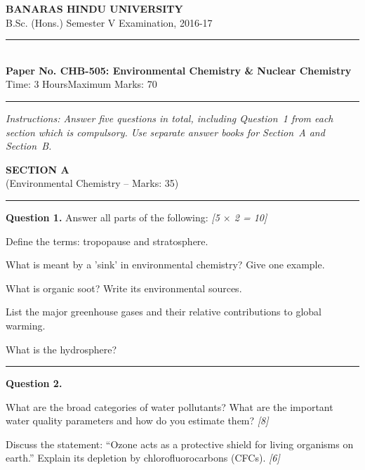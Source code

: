 \documentclass[11pt,a4paper]{article}
\newcommand{\pts}[1]{\hfill   \textit{[#1]}}
\begin{document}
\begin{center}
  {\large\bfseries BANARAS HINDU UNIVERSITY}\\[2pt]
  {\normalsize B.Sc. (Hons.) Semester V Examination, 2016-17}\\[6pt]
  \rule{0.8\linewidth}{0.5pt}\\[6pt]
  {\large\bfseries Paper No. CHB-505: Environmental Chemistry \& Nuclear Chemistry}\\[4pt]
  {\normalsize Time: 3 Hours\hfill Maximum Marks: 70}
\end{center}
\rule{\linewidth}{0.4pt}
\small



\noindent   \textit{Instructions: Answer five questions in total, including Question~1 from each section which is compulsory. Use separate answer books for Section~A and Section~B.}

\normalsize
\bigskip


\begin{center}
  {\large\bfseries SECTION A}\\[2pt]
  {\normalsize (Environmental Chemistry -- Marks: 35)}
\end{center}
\rule{0.4\linewidth}{0.2pt}
\smallskip




\noindent   \textbf{Question 1.} Answer all parts of the following: \pts{5 $ \times$ 2 = 10}

\begin{parts}
  \item Define the terms: tropopause and stratosphere.
  \item What is meant by a 'sink' in environmental chemistry? Give one example.
  \item What is organic soot? Write its environmental sources.
  \item List the major greenhouse gases and their relative contributions to global warming.
  \item What is the hydrosphere?
\end{parts}

\medskip\rule{\linewidth}{0.2pt}




\noindent   \textbf{Question 2.}

\begin{parts}
  \item What are the broad categories of water pollutants? What are the important water quality parameters and how do you estimate them? \pts{8}
  \item Discuss the statement: ``Ozone acts as a protective shield for living organisms on earth.'' Explain its depletion by chlorofluorocarbons (CFCs). \pts{6}
\end{parts}
\end{document}
